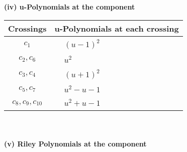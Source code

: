 \documentclass[1p]{elsarticle_modified}
\theoremstyle{definition}
\begin{document}
\newpage\renewcommand{\arraystretch}{1}
\flushleft \textbf{(iv) u-Polynomials at the component}\newline \\
\begin{tabular}{m{50pt}|m{274pt}}
Crossings & \hspace{64pt}u-Polynomials at each crossing \\
\hline $$\begin{aligned}c_{1}\end{aligned}$$&$\begin{aligned}
&(u-1)^2
\end{aligned}$\\
\hline $$\begin{aligned}c_{2},c_{6}\end{aligned}$$&$\begin{aligned}
&u^2
\end{aligned}$\\
\hline $$\begin{aligned}c_{3},c_{4}\end{aligned}$$&$\begin{aligned}
&(u+1)^2
\end{aligned}$\\
\hline $$\begin{aligned}c_{5},c_{7}\end{aligned}$$&$\begin{aligned}
&u^2- u-1
\end{aligned}$\\
\hline $$\begin{aligned}c_{8},c_{9},c_{10}\end{aligned}$$&$\begin{aligned}
&u^2+u-1
\end{aligned}$\\
\hline
\end{tabular}\\~\\
\newpage\renewcommand{\arraystretch}{1}
\flushleft \textbf{(v) Riley Polynomials at the component}\newline \\
\end{document}
